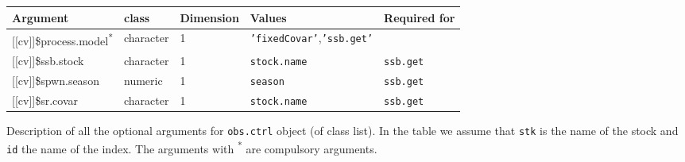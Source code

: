 \begin{landscape}
\begin{table}[!ht]
\begin{footnotesize}
    \label{tb:A3.table4}

    \begin{threeparttable}

      \begin{tabular}{lllll} %
        \hline
        Argument & class & Dimension & Values & Required for \\
        \hline
        {[[cv]]}\$process.model\textsuperscript{*} & character & 1 & \texttt{'fixedCovar'},\texttt{'ssb.get'}  &	\\
        {[[cv]]}\$ssb.stock & character & 1 & \texttt{stock.name} &	\texttt{ssb.get} \\
        {[[cv]]}\$spwn.season & numeric & 1 & \texttt{season} &	\texttt{ssb.get} \\
        {[[cv]]}\$sr.covar & character & 1 & \texttt{stock.name} &	\texttt{ssb.get} \\
        \hline
      \end{tabular}

    \end{threeparttable}
  \end{footnotesize}

\end{table}


\begin{table}[!ht]

  \centering
  \begin{footnotesize}

    \caption{Description of all the optional arguments for \texttt{obs.ctrl} object (of class list).
    In the table we assume that \texttt{stk} is the name of the stock and \texttt{id} the name of the index.
    The arguments with \textsuperscript{*} are compulsory arguments.}
    
    \label{tb:A3.table5}


    \begin{threeparttable}


\end{threeparttable}
\end{footnotesize}
\end{table}
\end{landscape}

